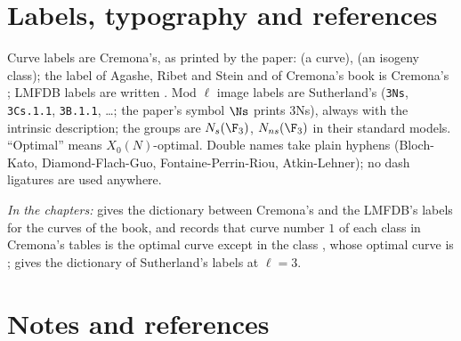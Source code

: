 \section{Labels, typography and references}\label{sec:notation:labels}

\begin{convention}\label{conv:notation:bc16}
Curve labels are Cremona's, as printed by the paper:  (a curve),  (an isogeny class); the label
 of Agashe, Ribet and Stein \cite{ARS12} and of Cremona's book \cite{Cremona97} is Cremona's ; LMFDB labels
are written . Mod $\ell$ image labels are Sutherland's \cite{Sutherland16} (\texttt{3Ns}, \texttt{3Cs.1.1}, \texttt{3B.1.1},
\dots; the paper's symbol $\Ns$ prints 3Ns), always with the intrinsic description; the groups are $N_s(\F_3)$, $N_{ns}(\F_3)$ in their
standard models. ``Optimal'' means $X_0(N)$-optimal. Double names take plain hyphens (Bloch-Kato, Diamond-Flach-Guo,
Fontaine-Perrin-Riou, Atkin-Lehner); no dash ligatures are used anywhere.
\end{convention}

\noindent\emph{In the chapters:}  gives the dictionary between Cremona's and the LMFDB's labels for the
curves of the book, and records that curve number $1$ of each class in Cremona's tables is the optimal curve except in the
class , whose optimal curve is ;  gives the dictionary of Sutherland's labels at
$\ell=3$.

\section{Notes and references}\label{sec:notation:notes}

